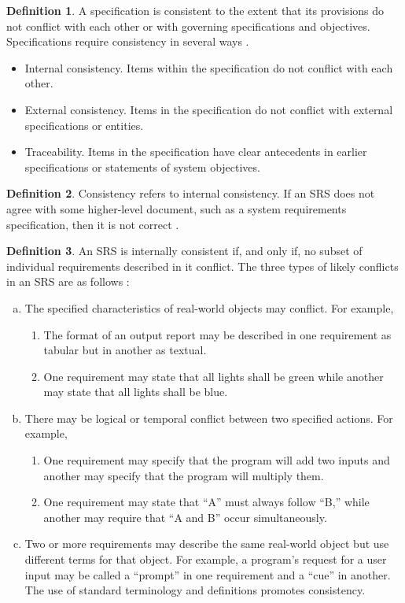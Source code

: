 \documentclass[letterpaper, cleveref]{lipics-v2019}
\theoremstyle{definition}
\newtheorem{defn}{Definition}
\begin{document}
\begin{defn}
  \label{ConsistencySelected} A specification is consistent to the extent
  that its provisions do not conflict with each other or with governing
  specifications and objectives. Specifications require consistency in
  several ways \citep{Boehm1984}.
  \begin{itemize}
  \item Internal consistency. Items within the specification do not conflict
    with each other.
  \item External consistency. Items in the specification do not conflict with
    external specifications or entities.
  \item Traceability. Items in the specification have clear antecedents in
    earlier specifications or statements of system objectives.
  \end{itemize}
\end{defn}

\begin{defn}
Consistency refers to internal consistency. If an SRS does not agree with some
higher-level document, such as a system requirements specification, then it is
not correct \citep{IEEE1998}.
\end{defn}

\begin{defn}
 An SRS is internally consistent if, and only if, no subset of individual
 requirements described in it conflict. The three types of likely conflicts
 in an SRS are as follows \citep{IEEE1998}:
 \begin{enumerate}[a)]
 \item The specified characteristics of real-world
 objects may conflict. For example,
 \begin{enumerate}[1)]
 \item The format of an output report may be described
 in one requirement as tabular but in another as textual.
 \item One
 requirement may state that all lights shall be green while another may
 state that all lights shall be blue.
 \end{enumerate}
 \item There may be logical or temporal conflict between two specified actions.
 For example,
 \begin{enumerate}[1)]
 \item One requirement may specify that the program will add two inputs and
 another may specify that the program will multiply them.
 \item One requirement may state that “A” must always follow “B,” while another
 may require that “A and B” occur simultaneously.
 \end{enumerate}
 \item Two or more requirements may describe the same real-world object but use
 different terms for that object. For example, a program’s request for a user
 input may be called a “prompt” in one requirement and a “cue” in another. The
 use of standard terminology and definitions promotes consistency.
 \end{enumerate}
\end{defn}
\end{document}
